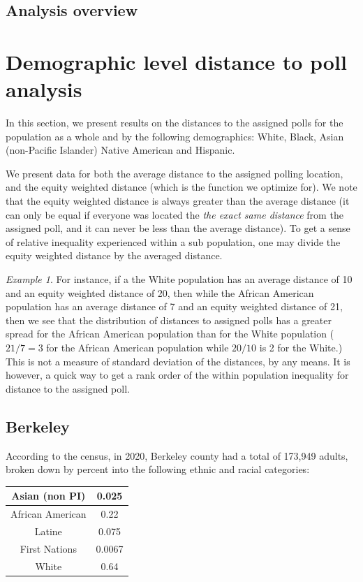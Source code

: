 \documentclass[11pt]{article}
\theoremstyle{remark}
\newtheorem{eg}[thm]{Example}
\theoremstyle{definition}
\begin{document}
\subsection{Analysis overview}

\section{Demographic level distance to poll analysis \label{sec:distances}}
In this section, we present results on the distances to the assigned polls for the population as a whole and by the following demographics: White, Black, Asian (non-Pacific Islander) Native American and Hispanic.

We present data for both the average distance to the assigned polling location, and the equity weighted distance (which is the function we optimize for). We note that the equity weighted distance is always greater than the average distance (it can only be equal if everyone was located the \emph{the exact same distance} from the assigned poll, and it can never be less than the average distance). To get a sense of relative inequality experienced within a sub population, one may divide the equity weighted distance by the averaged distance. 
\begin{eg}
	For instance, if a the White population has an average distance of 10 and an equity weighted distance of 20, then while the African American population has an average distance of 7 and an equity weighted distance of 21, then we see that the distribution of distances to assigned polls has a greater spread for the African American population than for the White population ($21/7 = 3$ for the African American population while $20/10$ is 2 for the White.) This is not a measure of standard deviation of the distances, by any means. It is however, a quick way to get a rank order of the within population inequality for distance to the assigned poll.
\end{eg}

\subsection{Berkeley \label{sec:Berkeley distances}}
According to the census, in 2020, Berkeley county had a total of 173,949 adults, broken down by percent into the following ethnic and racial categories:

\begin{tabular} {| c | c |} 
	\hline
	Asian (non PI) &  0.025 \\ \hline
	African American & 0.22 \\ \hline
	Latine & 0.075 \\ \hline
	First Nations & 0.0067 \\ \hline
	White  & 0.64 \\ \hline
\end{tabular}
\end{document}
